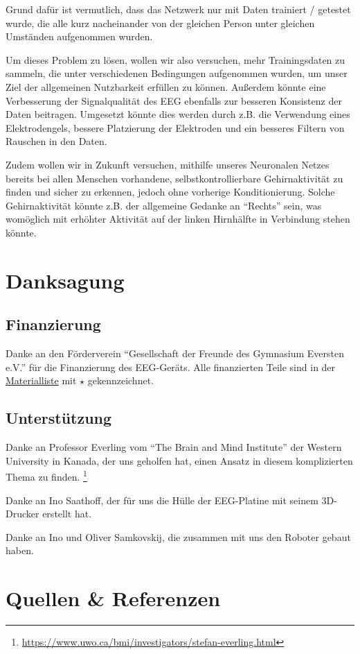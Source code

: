 \documentclass{scrartcl}
\begin{document}
	Grund dafür ist vermutlich, dass das Netzwerk nur mit Daten trainiert / getestet wurde, die alle kurz nacheinander von der gleichen Person unter gleichen Umständen aufgenommen wurden. 

	Um dieses Problem zu lösen, wollen wir also versuchen, mehr Trainingsdaten zu sammeln, die unter verschiedenen Bedingungen aufgenommen wurden, um unser Ziel der allgemeinen Nutzbarkeit erfüllen zu können. Außerdem könnte eine Verbesserung der Signalqualität des EEG ebenfalls zur besseren Konsistenz der Daten beitragen. Umgesetzt könnte dies werden durch z.B. die Verwendung eines Elektrodengels, bessere Platzierung der Elektroden und ein besseres Filtern von Rauschen in den Daten.

	Zudem wollen wir in Zukunft versuchen, mithilfe unseres Neuronalen Netzes bereits bei allen Menschen vorhandene, selbstkontrollierbare Gehirnaktivität zu finden und sicher zu erkennen, jedoch ohne vorherige Konditionierung. Solche Gehirnaktivität könnte z.B. der allgemeine Gedanke an \enquote{Rechts} sein, was womöglich mit erhöhter Aktivität auf der linken Hirnhälfte in Verbindung stehen könnte. 

	\section{Danksagung}

	\subsection{Finanzierung} \label{Foerderverein}

	Danke an den Förderverein \enquote{Gesellschaft der Freunde des Gymnasium Eversten e.V.} für die Finanzierung des EEG-Geräts. Alle finanzierten Teile sind in der \hyperref[Materialien]{Materialliste} mit $\star$ gekennzeichnet. 

	\subsection{Unterstützung}

	Danke an Professor Everling vom \enquote{The Brain and Mind Institute} der Western University in Kanada, der uns geholfen hat, einen Ansatz in diesem komplizierten Thema zu finden. \footnote{\href{https://www.uwo.ca/bmi/investigators/stefan-everling.html}{https://www.uwo.ca/bmi/investigators/stefan-everling.html}}

	Danke an Ino Saathoff, der für uns die Hülle der EEG-Platine mit seinem 3D-Drucker erstellt hat.

	Danke an Ino und Oliver Samkovskij, die zusammen mit uns den Roboter gebaut haben.

	\section{Quellen \& Referenzen}

	\printbibliography[title={Literatur}, keyword={Literatur}, notkeyword={YTVideos}]

	\printbibliography[title={Videos}, keyword={YTVideos}]

	\printbibliography[title=Programme, keyword=Programme]
\end{document}
